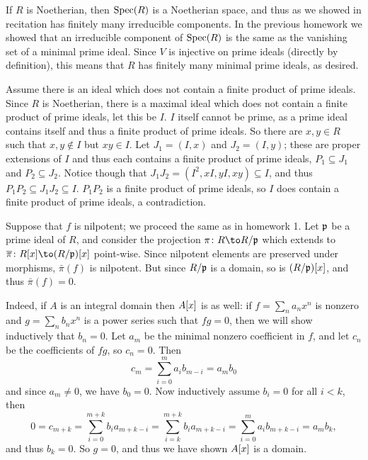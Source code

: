 \eprob

\benum
    \item If $R$ is Noetherian, then ${\rm Spec}(R)$ is a Noetherian space, and thus as we showed in recitation has
    finitely many irreducible components.
    In the previous homework we showed that an irreducible component of ${\rm Spec}(R)$ is the same as the vanishing set
    of a minimal prime ideal.
    Since $V$ is injective on prime ideals (directly by definition), this means that $R$ has finitely many minimal prime
    ideals, as desired.

    \item Assume there is an ideal which does not contain a finite product of prime ideals.
    Since $R$ is Noetherian, there is a maximal ideal which does not contain a finite product of prime ideals, let this
    be $I$.
    $I$ itself cannot be prime, as a prime ideal contains itself and thus a finite product of prime ideals.
    So there are $x,y\in R$ such that $x,y\notin I$ but $xy\in I$.
    Let $J_1=(I,x)$ and $J_2=(I,y)$; these are proper extensions of $I$ and thus each contains a finite product
    of prime ideals, $P_1\subseteq J_1$ and $P_2\subseteq J_2$.
    Notice though that $J_1J_2=(I^2,xI,yI,xy)\subseteq I$, and thus $P_1P_2\subseteq J_1J_2\subseteq I$.
    $P_1P_2$ is a finite product of prime ideals, so $I$ does contain a finite product of prime ideals, a contradiction.

    \item Suppose that $f$ is nilpotent; we proceed the same as in homework 1.
    Let ${{\frak p}}$ be a prime ideal of $R$, and consider the projection $\pi\colon R\to R/\p$ which extends to
    $\bar\pi\colon R\bracks x\to(R/\p)\bracks x$ point-wise.
    Since nilpotent elements are preserved under morphisms, $\bar\pi(f)$ is nilpotent.
    But since $R/{{\frak p}}$ is a domain, so is $(R/{{\frak p}})\mathopen{}\mathclose{\left[x\right]}$, and thus $\bar\pi(f)=0$.

    Indeed, if $A$ is an integral domain then $A\mathopen{}\mathclose{\left[x\right]}$ is as well: if $f=\sum_na_nx^n$ is nonzero and $g=\sum_nb_nx^n$
    is a power series such that $fg=0$, then we will show inductively that $b_n=0$.
    Let $a_m$ be the minimal nonzero coefficient in $f$, and let $c_n$ be the coefficients of $fg$, so $c_n=0$.
    Then
    $$ c_m = \sum_{i=0}^m a_ib_{m-i} = a_mb_0 $$
    and since $a_m\neq0$, we have $b_0=0$.
    Now inductively assume $b_i=0$ for all $i<k$, then
    $$ 0 = c_{m+k} = \sum_{i=0}^{m+k} b_ia_{m+k-i} = \sum_{i=k}^{m+k}b_ia_{m+k-i} = \sum_{i=0}^m a_ib_{m+k-i} = a_mb_k , $$
    and thus $b_k=0$.
    So $g=0$, and thus we have shown $A\mathopen{}\mathclose{\left[x\right]}$ is a domain.

